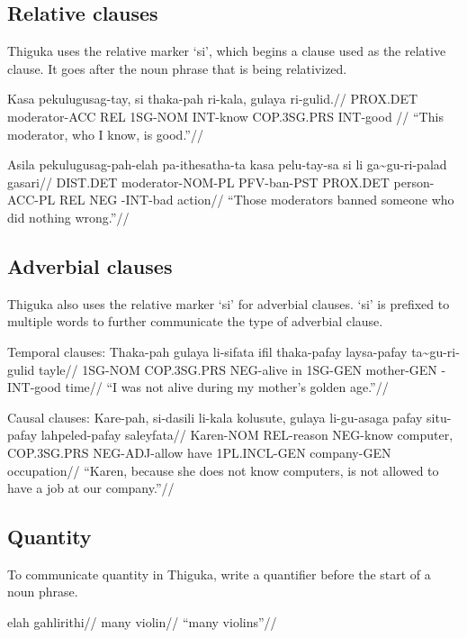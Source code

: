 \subsection{Relative clauses}
Thiguka uses the relative marker `si', which begins a clause used as the relative clause.
It goes after the noun phrase that is being relativized.

\ex
\begingl
    \gla  Kasa     pekulugusag-tay, si  thaka-pah ri-kala, gulaya      ri-gulid.//
    \glb              PROX.DET moderator-ACC    REL 1SG-NOM   INT-know COP.3SG.PRS INT-good //
    \glft``This moderator, who I know, is good.''//
\endgl
\xe

\ex
\begingl
    \gla  Asila    pekulugusag-pah-elah pa-ithesatha-ta kasa pelu-tay-sa       si  li  ga\~{}gu-ri-palad gasari//
    \glb              DIST.DET moderator-NOM-PL     PFV-ban-PST     PROX.DET person-ACC-PL REL NEG \agradj{}-INT-bad action//
    \glft``Those moderators banned someone who did nothing wrong.''//
\endgl
\xe


\subsection{Adverbial clauses}
Thiguka also uses the relative marker `si' for adverbial clauses. `si' is prefixed to
multiple words to further communicate the type of adverbial clause.

Temporal clauses:
\ex
\begingl
    \gla  Thaka-pah gulaya      li-sifata ifil thaka-pafay laysa-pafay ta\~{}gu-ri-gulid  tayle//
    \glb  1SG-NOM   COP.3SG.PRS NEG-alive in   1SG-GEN     mother-GEN  \agradj{}-INT-good time//
    \glft ``I was not alive during my mother's golden age.''//
\endgl
\xe


Causal clauses:
\ex
\begingl
    \gla  Kare-pah, si-dasili  li-kala  kolusute, gulaya      li-gu-asaga   pafay situ-pafay   lahpeled-pafay saleyfata//
    \glb  Karen-NOM REL-reason NEG-know computer, COP.3SG.PRS NEG-ADJ-allow have  1PL.INCL-GEN company-GEN    occupation//
    \glft``Karen, because she does not know computers, is not allowed to have a job at our company.''//
\endgl
\xe

\subsection{Quantity}
To communicate quantity in Thiguka, write a quantifier before the start of a noun phrase.

\ex
\begingl
    \gla  elah gahlirithi//
    \glb  many violin//
    \glft ``many violins''//
\endgl
\xe


